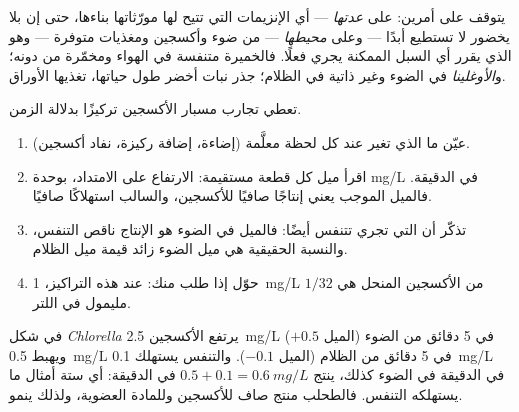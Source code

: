\begin{proposition}\label{prop:g10:cell-metabolism:decides}
يتوقف   على أمرين: على \emph{عدتها} --- أي الإنزيمات
 التي تتيح لها مورّثاتها بناءها، حتى إن  بلا يخضور لا
تستطيع  أبدًا --- وعلى \emph{محيطها} --- من ضوء وأكسجين
ومغذيات متوفرة --- وهو الذي يقرر أي السبل الممكنة يجري فعلًا. فالخميرة
متنفسة في الهواء ومخمّرة من دونه؛ و\emph{الأوغلينا}  في
الضوء وغير ذاتية في الظلام؛  جذر نبات أخضر  طول
حياتها، تغذيها الأوراق.
\end{proposition}
\admitted

\begin{method}\label{met:g10:cell-metabolism:trace}
تعطي تجارب مسبار الأكسجين تركيزًا بدلالة الزمن.
\begin{enumerate}
  \item عيّن ما الذي تغير عند كل لحظة معلَّمة (إضاءة، إضافة ركيزة،
        نفاد أكسجين).
  \item اقرأ ميل كل قطعة مستقيمة: الارتفاع على الامتداد، بوحدة
        \unit{mg/L} في الدقيقة. فالميل الموجب يعني إنتاجًا صافيًا
        للأكسجين، والسالب استهلاكًا صافيًا.
  \item تذكّر أن  التي تجري  تتنفس أيضًا: فالميل
        في الضوء هو الإنتاج ناقص التنفس، والنسبة الحقيقية  هي ميل الضوء زائد قيمة ميل الظلام.
  \item حوّل إذا طلب منك: عند هذه التراكيز، \qty{1}{mg/L} من الأكسجين
        المنحل هي $1/32$ مليمول في اللتر.
\end{enumerate}
\end{method}

\begin{example}\label{ex:g10:cell-metabolism:truerate}
في شكل \emph{Chlorella} يرتفع الأكسجين \qty{2.5}{mg/L} في 5 دقائق من
الضوء (الميل $+0.5$) ويهبط \qty{0.5}{mg/L} في 5 دقائق من الظلام
(الميل $-0.1$). والتنفس يستهلك \qty{0.1}{mg/L} في الدقيقة في الضوء
كذلك،  ينتج $0.5 + 0.1 = \qty{0.6}{mg/L}$ في الدقيقة:
أي ستة أمثال ما يستهلكه التنفس. فالطحلب منتج صاف للأكسجين وللمادة
العضوية، ولذلك ينمو.
\end{example}

